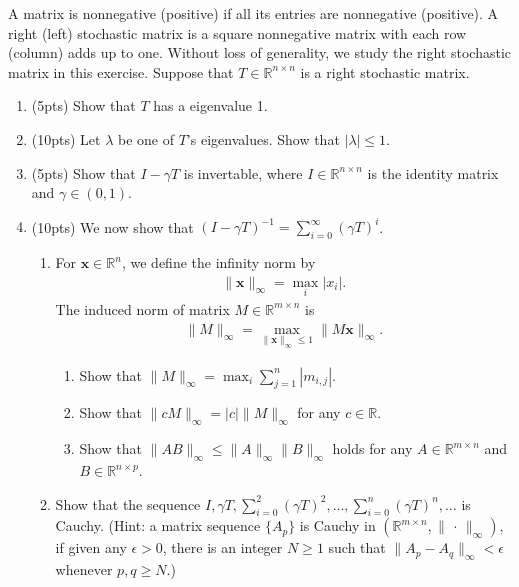 \documentclass[11pt,letter,notitlepage]{article}
\begin{document}
\newpage
\begin{exercise}
	A matrix is nonnegative (positive) if all its entries are nonnegative (positive). A right (left) stochastic matrix is a square nonnegative matrix with each row (column) adds up to one. Without loss of generality, we study the right stochastic matrix in this exercise. Suppose that $T \in \mathbb{R}^{n \times n}$ is a right stochastic matrix.
	\begin{enumerate}
		\item (5pts) Show that $T$ has a eigenvalue 1.
		\item (10pts) Let $\lambda$ be one of $T$'s eigenvalues. Show that $|\lambda|\leq 1$.
		\item (5pts) Show that $I-\gamma T$ is invertable, where $I\in \mathbb{R}^{n\times n}$ is the identity matrix and $\gamma\in(0,1)$.
		\item (10pts) We now show that $(I-\gamma T)^{-1}=\sum_{i=0}^\infty(\gamma T)^i$.
		      \begin{enumerate}
			      \item For $\mathbf{x}\in\mathbb{R}^n$, we define the infinity norm by
			            \begin{align*}
				            \|\mathbf{x}\|_{\infty}=\max_{i}|x_i|.
			            \end{align*}
			            The induced norm of matrix $M\in\mathbb{R}^{m\times n}$ is
			            \begin{align*}
				            \|M\|_{\infty}=\max_{\|\mathbf{x}\|_{\infty}\leq 1}\|M\mathbf{x}\|_{\infty}.
			            \end{align*}
			            \begin{enumerate}
				            \item Show that $\|M\|_{\infty}=\max_{i}\sum_{j=1}^n|m_{i,j}|$.
				            \item Show that $\|cM\|_{\infty}=|c|\|M\|_{\infty}$ for any $c\in\mathbb{R}$.
				            \item Show that $\|AB\|_{\infty}\leq\|A\|_{\infty}\|B\|_{\infty}$ holds for any $A\in\mathbb{R}^{m\times n}$ and $B\in\mathbb{R}^{n\times p}$.
			            \end{enumerate}
			      \item Show that the sequence $I, \gamma T, \sum_{i=0}^2(\gamma T)^2,\dots,\sum_{i=0}^n(\gamma T)^n,\ldots$ is Cauchy. (Hint: a matrix sequence $\{A_p\}$ is Cauchy in $(\mathbb{R}^{m\times n}, \|\, \cdot \, \|_{\infty})$, if given any $\epsilon>0$, there is an integer $N\geq 1$ such that $\| A_p-A_q \|_{\infty}<\epsilon$ whenever $p,q \geq N$.)

\end{enumerate}
\end{enumerate}
\end{exercise}
\end{document}
